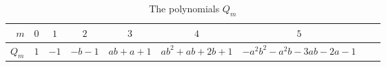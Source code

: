 \documentclass[ALCO,ThmDefs,Unicode,epreuves]{cedram}
\begin{document}
\begin{table}[ht]
\renewcommand{\arraystretch}{1.2}
\begin{tabular}{|r||c|c|c|c|c|c|c|c|}
\hline
$m$&$0$&$1$&$2$&$3$&$4$&$5$\\\hline\hline
$Q_m$&	{\small$1$}	&{\small$-1$}	&{\small$-b-1$}&{\small$ab+a+1$}&{\small$ab^2+ab+2b+1$}&{\small$-a^2b^2-a^2b-3ab-2a-1$}	\\\hline
\end{tabular} \\[3pt]
\caption{The polynomials $Q_m$}
\label{qm table}
\end{table}
\end{document}
